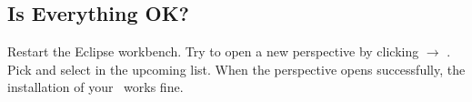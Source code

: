 \subsection{Is Everything OK?} 
Restart the Eclipse workbench. Try to open a new perspective by clicking  $\rightarrow$ . Pick  and select  in the upcoming list.
When the perspective opens successfully, the installation of your \cjdt ~works fine.
